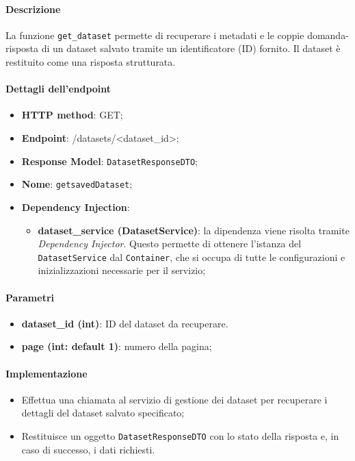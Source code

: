 \paragraph{Descrizione}
La funzione \texttt{get\_dataset} permette di recuperare i metadati e le coppie domanda-risposta di un dataset salvato tramite un identificatore (ID) fornito. Il dataset è restituito come una risposta strutturata.
\paragraph{Dettagli dell'endpoint}
\begin{itemize}
    \item \textbf{HTTP method}: GET;
    \item \textbf{Endpoint}: /datasets/\textless dataset\_id\textgreater;
    \item \textbf{Response Model}: \texttt{DatasetResponseDTO};
    \item \textbf{Nome}: \texttt{getsavedDataset};
    \item \textbf{Dependency Injection}: 
    \begin{itemize}
        \item \textbf{dataset\_service (DatasetService)}: la dipendenza viene risolta tramite \textit{Dependency Injector}. Questo permette di ottenere l'istanza del \texttt{DatasetService} dal \texttt{Container}, che si occupa di tutte le configurazioni e inizializzazioni necessarie per il servizio;
    \end{itemize}
\end{itemize}
\paragraph{Parametri}
\begin{itemize}
    \item \textbf{dataset\_id (int)}: ID del dataset da recuperare.
    \item \textbf{page (int: default 1)}: numero della pagina;
\end{itemize}
\paragraph{Implementazione}
\begin{itemize}
    \item Effettua una chiamata al servizio di gestione dei dataset per recuperare i dettagli del dataset salvato specificato;
    \item Restituisce un oggetto \texttt{DatasetResponseDTO} con lo stato della risposta e, in caso di successo, i dati richiesti.
\end{itemize}

